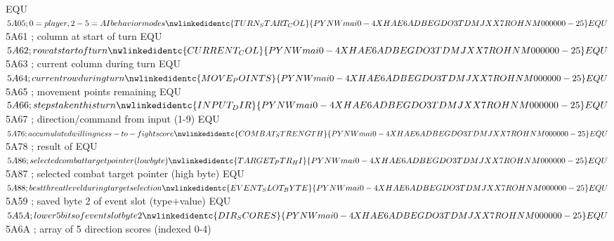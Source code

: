 \documentclass[10pt]{report}
\begin{document}
\nwenddocs{}\plusendmoddef\nwstartdeflinemarkup{}\nwenddeflinemarkup
{}    EQU     $5A05   ; 0 = player, 2-5 = AI behavior modes
\nwlinkedidentc{TURN_START_COL}{PYNWmai0-4XHAE6ADBEGDO3TDMJXX7ROHNM000000-25}  EQU     $5A61   ; column at start of turn
  EQU     $5A62   ; row at start of turn
\nwlinkedidentc{CURRENT_COL}{PYNWmai0-4XHAE6ADBEGDO3TDMJXX7ROHNM000000-25}     EQU     $5A63   ; current column during turn
     EQU     $5A64   ; current row during turn
\nwlinkedidentc{MOVE_POINTS}{PYNWmai0-4XHAE6ADBEGDO3TDMJXX7ROHNM000000-25}     EQU     $5A65   ; movement points remaining
     EQU     $5A66   ; steps taken this turn
\nwlinkedidentc{INPUT_DIR}{PYNWmai0-4XHAE6ADBEGDO3TDMJXX7ROHNM000000-25}       EQU     $5A67   ; direction/command from input (1-9)
 EQU  $5A76   ; accumulated willingness-to-fight score
\nwlinkedidentc{COMBAT_STRENGTH}{PYNWmai0-4XHAE6ADBEGDO3TDMJXX7ROHNM000000-25} EQU     $5A78   ; result of 
   EQU     $5A86   ; selected combat target pointer (low byte)
\nwlinkedidentc{TARGET_PTR_HI}{PYNWmai0-4XHAE6ADBEGDO3TDMJXX7ROHNM000000-25}   EQU     $5A87   ; selected combat target pointer (high byte)
     EQU     $5A88   ; best threat level during target selection
\nwlinkedidentc{EVENT_SLOT_BYTE}{PYNWmai0-4XHAE6ADBEGDO3TDMJXX7ROHNM000000-25} EQU     $5A59   ; saved byte 2 of event slot (type+value)
 EQU     $5A5A   ; lower 5 bits of event slot byte 2
\nwlinkedidentc{DIR_SCORES}{PYNWmai0-4XHAE6ADBEGDO3TDMJXX7ROHNM000000-25}      EQU     $5A6A   ; array of 5 direction scores (indexed 0-4)
\end{document}
